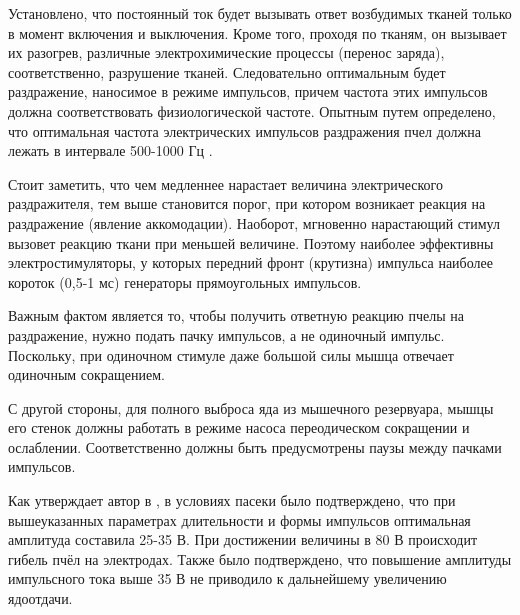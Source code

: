 Установлено, что постоянный ток будет вызывать ответ возбудимых тканей только в момент включения и выключения. Кроме того, проходя по тканям, он вызывает их разогрев, различные электрохимические процессы (перенос заряда), соответственно, разрушение тканей. Следовательно оптимальным будет раздражение, наносимое в режиме импульсов, причем частота этих импульсов должна соответствовать физиологической частоте. Опытным путем определено, что оптимальная частота электрических импульсов раздражения пчел должна лежать в интервале 500-1000 Гц \cite{Krylov_1995}.

Стоит заметить, что чем медленнее нарастает величина электрического раздражителя, тем выше становится порог, при котором возникает реакция на раздражение (явление аккомодации). Наоборот, мгновенно нарастающий стимул вызовет реакцию ткани при меньшей величине. Поэтому наиболее эффективны электростимуляторы, у которых передний фронт (крутизна) импульса наиболее короток (0,5-1 мс) \longndash генераторы прямоугольных импульсов.

Важным фактом является то, чтобы получить ответную реакцию пчелы на раздражение, нужно подать пачку импульсов, а не одиночный импульс. Поскольку, при одиночном стимуле даже большой силы мышца отвечает одиночным сокращением.

С другой стороны, для полного выброса яда из мышечного резервуара, мышцы его стенок должны работать в режиме насоса \longndash переодическом сокращении и ослаблении. Соответственно должны быть предусмотрены паузы между пачками импульсов.

Как утверждает автор в \cite{Krylov_1995}, в условиях пасеки было подтверждено, что при вышеуказанных параметрах длительности и формы импульсов оптимальная амплитуда составила 25-35 В. При достижении величины в 80 В происходит гибель пчёл на электродах. Также было подтверждено, что повышение амплитуды импульсного тока выше 35 В не приводило к дальнейшему увеличению ядоотдачи.